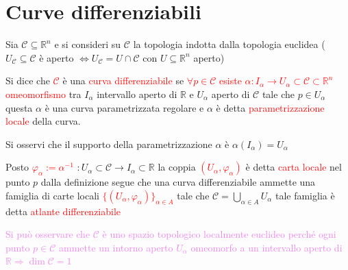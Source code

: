     \section{Curve differenziabili}
        \begin{definizione}
        \label{def:curva_differenziabile}
        Sia $\mathcal{C} \subseteq \mathbb{R}^n$ e si consideri su $\mathcal{C}$ la topologia indotta dalla topologia euclidea
        \textcolor{blu}{($U_{\mathcal{C}} \subseteq \mathcal{C}$ è aperto $\iff U_{\mathcal{C}} = U \cap \mathcal{C}$ con $U \subseteq \mathbb{R}^n$ aperto)}
        
        Si dice che \textcolor{red}{$\mathcal{C}$} è una \textcolor{red}{curva differenziabile} se \textcolor{red}{$\forall p \in \mathcal{C}$ esiste $\alpha : I_{\alpha} \to U_{\alpha} \subset \mathcal{C} \subset \mathbb{R}^n$ 
        omeomorfismo} tra $I_{\alpha}$ intervallo aperto di $\mathbb{R}$ e $U_{\alpha}$ aperto di $\mathcal{C}$ tale che $p \in U_{\alpha}$ questa
        $\alpha$ è una curva parametrizzata regolare e $\alpha$ è detta \textcolor{red}{parametrizzazione locale} della curva.

        Si osservi che il supporto della parametrizzazione $\alpha$ è $\alpha(I_{\alpha})=U_{\alpha}$

        Posto \textcolor{red}{$\varphi_{\alpha} := \alpha^{-1}$} $: U_{\alpha} \subset \mathcal{C} \to I_{\alpha} \subset \mathbb{R}$ la coppia 
        \textcolor{red}{$\left(U_{\alpha}, \varphi_{\alpha}\right)$} è detta \textcolor{red}{carta locale} nel punto $p$ dalla definizione segue che una curva differenziabile 
        ammette una famiglia di carte locali \textcolor{red}{$\{(U_{\alpha}, \varphi_{\alpha})\}_{\alpha \in A}$} tale che $\displaystyle \mathcal{C}=\bigcup_{\alpha \in A} U_{\alpha}$
        tale famiglia è detta \textcolor{red}{atlante differenziabile} 

        \textcolor{violet}{Si può osservare che $\mathcal{C}$ è uno spazio topologico localmente euclideo perché ogni punto $p \in \mathcal{C}$ ammette
        un intorno aperto $U_{\alpha}$ omeomorfo a un intervallo aperto di $\mathbb{R} \Rightarrow \dim \mathcal{C}=1$}
        \begin{center}
\end{center}
\end{definizione}
